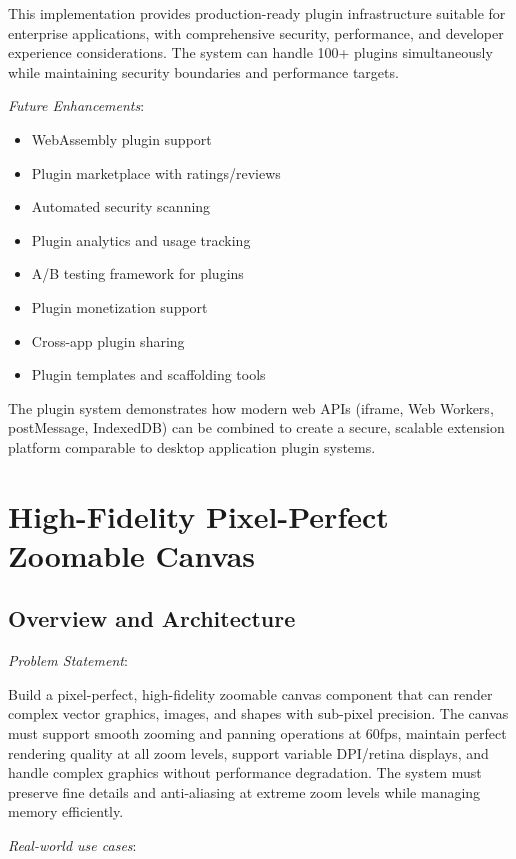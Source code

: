 \documentclass[11pt]{article}
\begin{document}
This implementation provides production-ready plugin infrastructure suitable for enterprise applications, with comprehensive security, performance, and developer experience considerations. The system can handle 100+ plugins simultaneously while maintaining security boundaries and performance targets.

\emph{Future Enhancements}:

\begin{itemize}
\item WebAssembly plugin support
\item Plugin marketplace with ratings/reviews
\item Automated security scanning
\item Plugin analytics and usage tracking
\item A/B testing framework for plugins
\item Plugin monetization support
\item Cross-app plugin sharing
\item Plugin templates and scaffolding tools
\end{itemize}

The plugin system demonstrates how modern web APIs (iframe, Web Workers, postMessage, IndexedDB) can be combined to create a secure, scalable extension platform comparable to desktop application plugin systems.
\section{High-Fidelity Pixel-Perfect Zoomable Canvas}
\label{sec:orgdab6e5b}

\subsection{Overview and Architecture}
\label{sec:org73d9886}

\emph{Problem Statement}:

Build a pixel-perfect, high-fidelity zoomable canvas component that can render complex vector graphics, images, and shapes with sub-pixel precision. The canvas must support smooth zooming and panning operations at 60fps, maintain perfect rendering quality at all zoom levels, support variable DPI/retina displays, and handle complex graphics without performance degradation. The system must preserve fine details and anti-aliasing at extreme zoom levels while managing memory efficiently.

\emph{Real-world use cases}:
\end{document}
